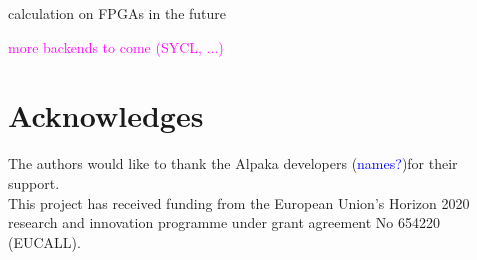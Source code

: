 \documentclass[a4paper]{article}
\begin{document}
calculation on FPGAs in the future

\textcolor{magenta}{
more backends to come (SYCL, ...)
}

\section{Acknowledges}
The authors would like to thank the Alpaka developers (\textcolor{blue}{names?})for their support.\\

This project has received funding from the European Union's Horizon 2020 research and innovation programme under grant agreement No 654220 (EUCALL).

\newpage

\begin{sloppypar}
\printbibliography
\end{sloppypar}
\end{document}

